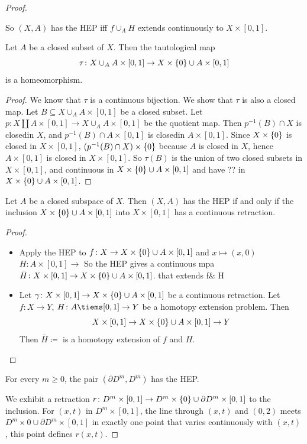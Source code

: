 \documentclass{TemplateLecture}
\begin{document}
\begin{proof}
\begin{proposition}
        So \((X,A)\) has the HEP iff \(f\cup_A H\) extends continuously to \(X\times [0,1]\).
    \end{proposition}
    \begin{lem}
        Let \(A\) be a closed subset of \(X\). Then the tautological map
        \[\tau\colon X\cup_A A\times [0,1] \to X \times \{0\} \cup A \times [0,1]\] is a homeomorphism.
    \end{lem}
    \begin{proof}
        We know that \(\tau\) is a continuous bijection. We show that \(\tau\) is also a closed map. Let \(B\subseteq X\cup_A A\times [0,1]\) be a closed subset. Let \(p\colon X \amalg A \times [0,1] \to X \cup_A A\times [0,1]\) be the quotient map. Then \(p^{-1}(B) \cap X\) is closedin \(X\), and \(p^{-1}(B) \cap A \times[0,1]\) is closedin \(A\times [0,1]\). Since \(X\times \{0\}\) is closed in \(X\times [0,1]\), \((p^{-1}(B)\cap X) \times \{0\}\) because \(A\) is closed in \(X\), hence \(A\times [0,1]\) is closed in \(X\times [0,1]\).
        So \(\tau(B)\) is the union of two closed subsets in \(X\times [0,1]\), and continuous in \(X\times \{0\} \cup A \times [0,1]\) and have ?? in \(X\times \{0\} \cup A \times [0,1]\).
    \end{proof}
    \begin{corollary}
        Let \(A\) be a closed subspace of \(X\). Then \((X,A)\) has the HEP if and only if the inclusion \(X\times \{0\} \cup A \times [0,1]\) into \(X\times [0,1]\) has a continuous retraction.
    \end{corollary}
    \begin{proof}
        \begin{itemize}
            \item[\Ra] Apply the HEP to \(f\colon X \to X\times \{0\} \cup A \times [0,1]\) and \(x \mapsto (x,0)\)
            \(H\colon A \times[0,1] \to \)%
            So the HEP gives a continuous mpa \(\bar H\colon X \times [0,1] \to X\times\{0\} \cup A \times [0,1]\). that extends f\& H
            \item[\La] Let \(\gamma \colon X \times [0,1] \to X \times \{0\} \cup A \times [0,1]\) be a continuous retraction. Let \(f\colon X\to Y\), \(H\colon A \tiems [0,1] \to Y\) be a homotopy extension problem. Then
            \[X \times [0,1] \to X \times \{0\} \cup A \times [0,1] \to Y\]
            Then \(\bar H \coloneq \)%
            is a homotopy extension of \(f\) and \(H\).
        \end{itemize}
    \end{proof}
    \begin{proposition}
        For every \(m \geq 0\), the pair \((\partial D^m, D^m)\) has the HEP. 
    \end{proposition}
    We exhibit a retraction \(r\colon D^m \times [0,1] \to D^m \times \{0\} \cup \partial D^m \times [0,1]\) to the inclusion.
    For \((x,t) \) in \(D^m \times [0,1]\), the line through \((x,t)\) and \((0,2)\) meets \(D^m \times 0 \cup \partial D^m \times [0,1]\) in exactly one point that varies continuously with \((x,t)\), this point defines \(r(x,t)\).


\end{proof}
\end{document}
